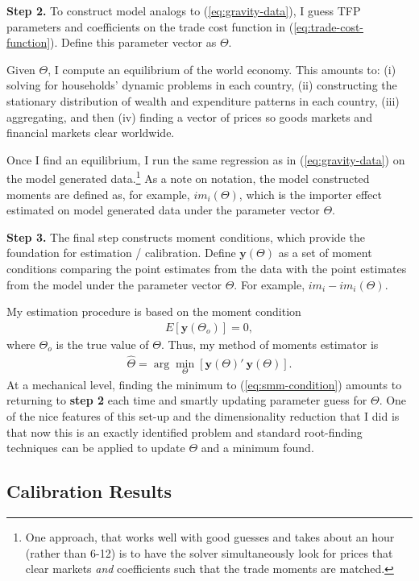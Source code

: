 \documentclass[12pt,pdftex]{article}
\begin{document}
\begin{onehalfspacing}
\textbf{Step 2.} To construct model analogs to (\ref{eq:gravity-data}), I guess TFP parameters and coefficients on the trade cost function in (\ref{eq:trade-cost-function}). Define this parameter vector as $\Theta$.

Given $\Theta$, I compute an equilibrium of the world economy. This amounts to: (i) solving for households' dynamic problems in each country, (ii) constructing the stationary distribution of wealth and expenditure patterns in each country, (iii) aggregating, and then (iv) finding a vector of prices so goods markets and financial markets clear worldwide.

Once I find an equilibrium, I run the same regression as in (\ref{eq:gravity-data}) on the model generated data.\footnote{One approach, that works well with good guesses and takes about an hour (rather than 6-12) is to have the solver simultaneously look for prices that clear markets \emph{and} coefficients such that the trade moments are matched.} As a note on notation, the model constructed moments are defined as, for example, $im_{i}(\Theta)$, which is the importer effect estimated on model generated data under the parameter vector $\Theta$.

\textbf{Step 3.} The final step constructs moment conditions, which provide the foundation for estimation / calibration. Define $\mathbf{y}(\Theta)$ as a set of moment conditions comparing the point estimates from the data with the point estimates from the model under the parameter vector $\Theta$. For example, ${im_{i}} - im_{i}(\Theta)$.

My estimation procedure is based on the moment condition
\begin{align}
E\left[\mathbf{y}(\Theta_o)\right] = 0,
\end{align}
where $\Theta_o$ is the true value of $\Theta$. Thus, my method of moments estimator is
\begin{align}
\hat{\Theta} = \arg\min_{\Theta} \left[\mathbf{y}(\Theta)'\ \mathbf{y}(\Theta)\right]. \label{eq:smm-condition}
\end{align}
At a mechanical level, finding the minimum to (\ref{eq:smm-condition}) amounts to returning to \textbf{step 2} each time and smartly updating parameter guess for $\Theta$. One of the nice features of this set-up and the dimensionality reduction that I did is that now this is an exactly identified problem and standard root-finding techniques can be applied to update $\Theta$ and a minimum found.

\subsection{Calibration Results}


\end{onehalfspacing}
\end{document}
